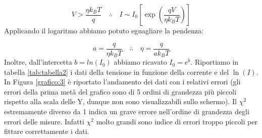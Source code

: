\documentclass{article}
\begin{document}
$$V>\frac{\eta k_B T}{q} \quad \therefore \quad I \sim I_0 \left[\exp\left(\frac{qV}{\eta k_B T}\right) \right]$$
\newline
Applicando il logaritmo abbiamo potuto eguagliare la pendenza:

$$a = \frac{q}{\eta k_B T} \quad \therefore \quad \eta = \frac{q}{ak_B T}$$
\newline
Inoltre, dall'intercetta $b=ln(I_0)$ abbiamo ricavato $I_0=e^b$.
\newline
\newline
Riportiamo in tabella \ref{tab:tabella2} i dati della tensione in funzione della corrente e del $\ln(I)$.
\\
In Figura \ref{grafico:3} è riportato l'andamento dei dati con i relativi errori (gli errori della prima metà del grafico sono di 5 ordini di grandezza più piccoli rispetto alla scala delle Y, dunque non sono visualizzabili sullo schermo). Il $\chi^2$ estremamente diverso da 1 indica un grave errore nell'ordine di grandezza degli errori delle misure. Infatti $\chi^2$ molto grandi sono indice di errori troppo piccoli per fittare correttamente i dati.
\end{document}
